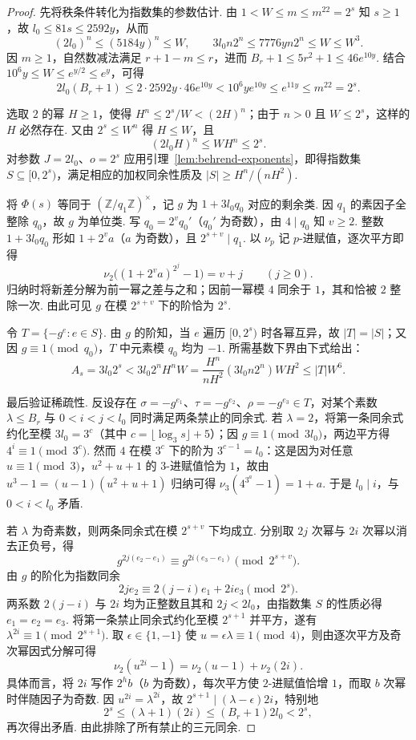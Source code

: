 \begin{proof}
先将秩条件转化为指数集的参数估计. 由 $1<W\le m\le m^{22}=2^s$ 知 $s\ge1$，故
$l_0\le81s\le2592y$，从而
\[
 (2l_0)^n\le(5184y)^n\le W,\qquad
 3l_0 n2^n\le7776yn2^n\le W\le W^3 .
\]
因 $m\ge1$，自然数减法满足 $r+1-m\le r$，进而
$B_r+1\le 5r^2+1\le46 e^{10y}$.
结合 $10^6y\le W\le e^{y/2}\le e^y$，可得
\[
 2l_0(B_r+1)
 \le 2\cdot2592y\cdot46e^{10y}
 <10^6y e^{10y}\le e^{11y}\le m^{22}=2^s .
\]

选取 $2$ 的幂 $H\ge1$，使得 $H^n\le2^s/W<(2H)^n$；由于 $n>0$ 且 $W\le2^s$，这样的 $H$ 必然存在.
又由 $2^s\le W^n$ 得 $H\le W$，且
\[
 (2l_0H)^n\le WH^n\le2^s.
\]
对参数 $J=2l_0$、$o=2^s$ 应用引理~\ref{lem:behrend-exponents}，即得指数集 $S\subseteq[0,2^s)$，满足相应的加权同余性质及 $|S|\ge H^n/(nH^2)$.

将 $\Phi(s)$ 等同于 $(\mathbb Z/q_1\mathbb Z)^\times$，记 $g$ 为 $1+3l_0q_0$ 对应的剩余类. 因 $q_1$ 的素因子全整除 $q_0$，故 $g$ 为单位类.
写 $q_0=2^v q_0'$（$q_0'$ 为奇数），由 $4\mid q_0$ 知 $v\ge2$. 整数 $1+3l_0q_0$ 形如 $1+2^v a$（$a$ 为奇数），且 $2^{s+v}\mid q_1$.
以 $\nu_p$ 记 $p$-进赋值，逐次平方即得
\[
 \nu_2\bigl((1+2^v a)^{2^j}-1\bigr)=v+j\qquad(j\ge0).
\]
归纳时将新差分解为前一幂之差与之和；因前一幂模 $4$ 同余于 $1$，其和恰被 $2$ 整除一次. 由此可见 $g$ 在模 $2^{s+v}$ 下的阶恰为 $2^s$.

令 $T=\{-g^e:e\in S\}$. 由 $g$ 的阶知，当 $e$ 遍历 $[0,2^s)$ 时各幂互异，故 $|T|=|S|$；又因 $g\equiv1\pmod{q_0}$，$T$ 中元素模 $q_0$ 均为 $-1$. 所需基数下界由下式给出：
\[
 A_s=3l_0 2^s
 <3l_0 2^n H^n W
 =\frac{H^n}{nH^2}(3l_0 n2^n)W H^2
 \le |T| W^6 .
\]

最后验证稀疏性. 反设存在 $\sigma=-g^{e_1}$、$\tau=-g^{e_2}$、$\rho=-g^{e_3}\in T$，对某个素数
$\lambda\le B_r$ 与 $0<i<j<l_0$ 同时满足两条禁止的同余式. 若 $\lambda=2$，将第一条同余式约化至模
$3l_0=3^c$（其中 $c=\lfloor\log_3 s\rfloor+5$）；因 $g\equiv1\pmod{3l_0}$，两边平方得 $4^i\equiv1\pmod{3^c}$.
然而 $4$ 在模 $3^c$ 下的阶为 $3^{c-1}=l_0$：这是因为对任意 $u\equiv1\pmod3$，$u^2+u+1$ 的 $3$-进赋值恰为 $1$，故由
$u^3-1=(u-1)(u^2+u+1)$ 归纳可得 $\nu_3(4^{3^a}-1)=1+a$. 于是 $l_0\mid i$，与 $0<i<l_0$ 矛盾.

若 $\lambda$ 为奇素数，则两条同余式在模 $2^{s+v}$ 下均成立. 分别取 $2j$ 次幂与 $2i$ 次幂以消去正负号，得
\[
 g^{2j(e_2-e_1)}\equiv g^{2i(e_3-e_1)}
 \pmod{2^{s+v}}.
\]
由 $g$ 的阶化为指数同余
\[
 2j e_2\equiv 2(j-i)e_1+2i e_3\pmod{2^s}.
\]
两系数 $2(j-i)$ 与 $2i$ 均为正整数且其和 $2j<2l_0$，由指数集 $S$ 的性质必得 $e_1=e_2=e_3$.
将第一条禁止同余式约化至模 $2^{s+1}$ 并平方，遂有 $\lambda^{2i}\equiv1\pmod{2^{s+1}}$.
取 $\epsilon\in\{1,-1\}$ 使 $u=\epsilon\lambda\equiv1\pmod4$，则由逐次平方及奇次幂因式分解可得
\[
 \nu_2(u^{2i}-1)=\nu_2(u-1)+\nu_2(2i).
\]
具体而言，将 $2i$ 写作 $2^h b$（$b$ 为奇数），每次平方使 $2$-进赋值恰增 $1$，而取 $b$ 次幂时伴随因子为奇数. 因 $u^{2i}=\lambda^{2i}$，故
$2^{s+1}\mid (\lambda-\epsilon)2i$，特别地
\[
 2^s\le(\lambda+1)(2i)\le (B_r+1)2l_0<2^s,
\]
再次得出矛盾. 由此排除了所有禁止的三元同余.
\end{proof}

